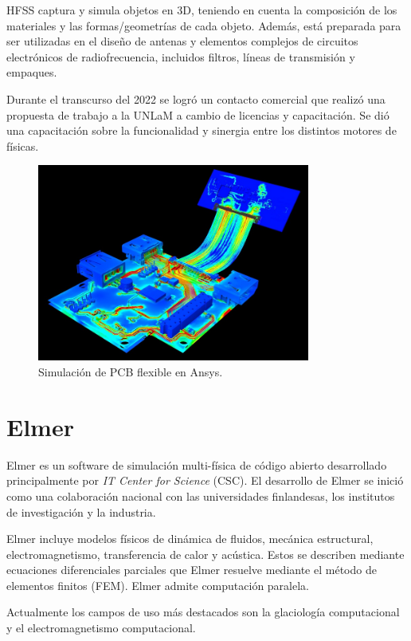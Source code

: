 \documentclass[
    11pt,
    spanish,
    a4paper
]{article}
\begin{document}
HFSS captura y simula objetos en 3D, teniendo en cuenta la composición de los materiales y las formas/geometrías de cada objeto.
Además, está preparada para ser utilizadas en el diseño de antenas y elementos complejos de circuitos electrónicos de radiofrecuencia, incluidos filtros, líneas de transmisión y empaques.

Durante el transcurso del 2022 se logró un contacto comercial que realizó una propuesta de trabajo a la UNLaM a cambio de licencias y capacitación.
Se dió una capacitación sobre la funcionalidad y sinergia entre los distintos motores de físicas.

\begin{figure}[htbp]
	\centering
	\includegraphics[width=0.8\textwidth]{img/ansys.jpg}
	\caption{Simulación de PCB flexible en Ansys.}
	\label{fig:ansys}
\end{figure}

\newpage

\section{Elmer}

Elmer es un software de simulación multi-física de código abierto desarrollado principalmente por \emph{IT Center for Science} (CSC).
El desarrollo de Elmer se inició como una colaboración nacional con las universidades finlandesas, los institutos de investigación y la industria.

Elmer incluye modelos físicos de dinámica de fluidos, mecánica estructural, electromagnetismo, transferencia de calor y acústica.
Estos se describen mediante ecuaciones diferenciales parciales que Elmer resuelve mediante el método de elementos finitos (FEM).
Elmer admite computación paralela.

Actualmente los campos de uso más destacados son la glaciología computacional y el electromagnetismo computacional.
\end{document}
